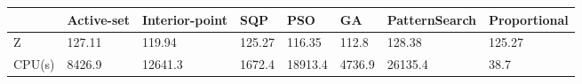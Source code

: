 \begin{tabular}{llllllll}
& Active-set & Interior-point & SQP & PSO & GA & PatternSearch & Proportional \\ 
\hline 
Z & 127.11 & 119.94 & 125.27 & 116.35 & 112.8 & 128.38 & 125.27 \\ 
CPU(s) & 8426.9 & 12641.3 & 1672.4 & 18913.4 & 4736.9 & 26135.4 & 38.7 \\ 
\hline 
\end{tabular}